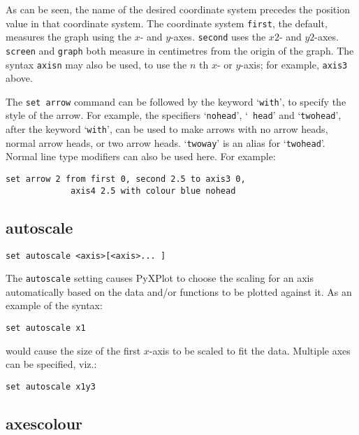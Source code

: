 \documentclass[a4paper,onecolumn,11pt]{book}
\begin{document}
As can be seen, the name of the desired coordinate system precedes the position
value in that coordinate system. The coordinate system {\tt first}, the default,
measures the graph using the $x$- and $y$-axes. {\tt second} uses the $x2$- and
$y2$-axes.  {\tt screen} and {\tt graph} both measure in centimetres from the
origin of the graph.  The syntax {\tt axisn} may also be
used, to use the $n$ th $x$- or $y$-axis; for example, {\tt axis3} above.

The {\tt set arrow} command can be followed by the keyword `{\tt with}', to
specify the style of the arrow. For example, the specifiers `{\tt nohead}', `{\tt
head}' and `{\tt twohead}', after the keyword `{\tt with}', can be used to make
arrows with no arrow heads, normal arrow heads, or two arrow heads. `{\tt twoway}'
is an alias for `{\tt twohead}'.  Normal line type modifiers can also be used
here.  For example:

\begin{verbatim}
set arrow 2 from first 0, second 2.5 to axis3 0,
             axis4 2.5 with colour blue nohead
\end{verbatim}



\subsection{autoscale}

\begin{verbatim}
set autoscale <axis>[<axis>... ] 
\end{verbatim}

The {\tt autoscale} setting causes PyXPlot to choose the scaling for an axis
automatically based on the data and/or functions to be plotted against it. As
an example of the syntax:

\begin{verbatim}
set autoscale x1
\end{verbatim}

\noindent would cause the size of the first $x$-axis to be scaled to fit the
data.  Multiple axes can be specified, viz.:

\begin{verbatim}
set autoscale x1y3
\end{verbatim}


\subsection{axescolour}
\end{document}
